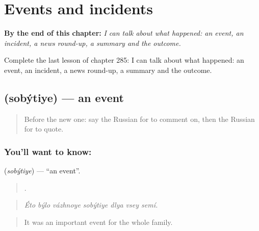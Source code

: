 
\chapter{Events and incidents}
\label{ch:ru-events-and-incidents}

\begin{chapteropening}
\textbf{By the end of this chapter:} \emph{I can talk about what happened: an event, an incident, a news round-up, a summary and the outcome.}

Complete the last lesson of chapter 285: I can talk about what happened: an event, an incident, a news round-up, a summary and the outcome.
\end{chapteropening}

\section[\texorpdfstring{\ru{событие} (sobýtiye)}{событие (sobýtiye)}]{ (sobýtiye) — an event}

\label{lesson:RU-C285-sobytiye}



\begin{quote}
Before the new one: say the Russian for to comment on, then the Russian for to quote.
\end{quote}

\subsection*{You'll want to know: }
\textbf{} (\emph{sobýtiye}) — \textquotedblleft{}an event\textquotedblright{}.

\begin{quote}
      .
\end{quote}

\begin{quote}
\emph{Éto býlo vázhnoye sobýtiye dlya vsey semí.}
\end{quote}

\begin{quote}
It was an important event for the whole family.
\end{quote}


